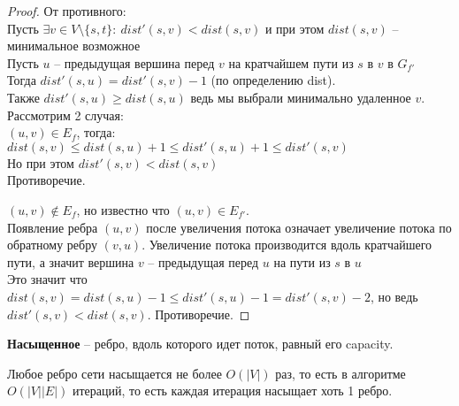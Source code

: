 \begin{proof} От противного: \\
	Пусть $\exists v \in V \setminus \{s, t\}:\ dist'(s, v) < dist(s, v)$ и при этом $dist(s, v)$ -- минимальное возможное \\
	Пусть $u$ -- предыдущая вершина перед  $v$	на кратчайшем пути из $s$ в  $v$ в $G_{f'}$ \\
	Тогда $dist'(s, u) = dist'(s, v) - 1$ (по определению dist). \\
	Также $dist'(s,u) \geq dist(s, u)$ ведь мы выбрали минимально удаленное $v$.\\
	Рассмотрим 2 случая: \\
		$(u, v) \in E_f$, тогда: \\
			$dist(s, v) \leq dist(s, u) + 1 \leq dist'(s, u) + 1 \leq dist'(s, v)$ \\
			Но при этом $dist'(s, v) < dist(s, v)$ \\
			Противоречие.
		
			$(u, v) \notin E_f$, но известно что $(u, v) \in E_{f'}$.\\
			Появление ребра $(u,v)$ после увеличения потока означает увеличение потока по обратному ребру $(v,u)$. Увеличение потока производится вдоль кратчайшего пути, а значит вершина  $v$ -- предыдущая перед  $u$ на пути из  $s$ в  $u$\\
			Это значит что  $dist(s, v) = dist(s, u) - 1 \leq dist'(s, u) - 1 = dist'(s, v) - 2$, но ведь $dist'(s, v) < dist(s, v)$. Противоречие.

\end{proof}

\begin{Def}
	\textbf{Насыщенное} -- ребро, вдоль которого идет поток, равный его capacity.
\end{Def}

\begin{lemma}
	Любое ребро сети насыщается не более $O(\lvert V \rvert)$ раз, то есть в алгоритме $O(\lvert V \rvert \lvert E \rvert)$ итераций, то есть каждая итерация насыщает хоть 1 ребро.
\end{lemma}

